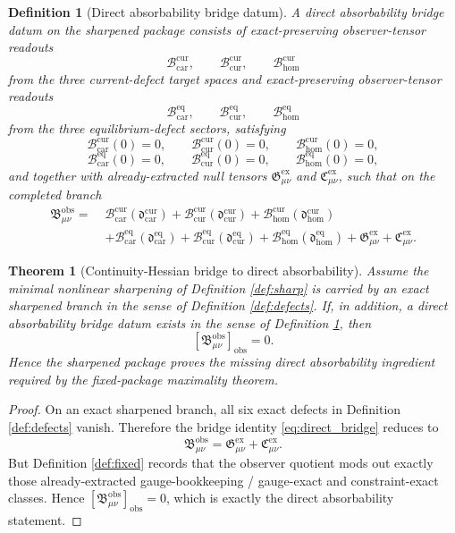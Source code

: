 \documentclass[11pt]{article}
\newcommand{\ObsBurden}{\mathfrak B_{\mu\nu}^{\mathrm{obs}}}
\newcommand{\ObserverClass}[1]{\left[#1\right]_{\mathrm{obs}}}
\newcommand{\GaugeExact}{\mathfrak G_{\mu\nu}^{\mathrm{ex}}}
\newcommand{\ConstraintExact}{\mathfrak C_{\mu\nu}^{\mathrm{ex}}}
\newcommand{\TensorCurrentBridge}{\mathcal B_{\mathrm{car}}^{\mathrm{cur}}}
\newcommand{\CurCurrentBridge}{\mathcal B_{\mathrm{cur}}^{\mathrm{cur}}}
\newcommand{\HomCurrentBridge}{\mathcal B_{\mathrm{hom}}^{\mathrm{cur}}}
\newcommand{\TensorEqBridge}{\mathcal B_{\mathrm{car}}^{\mathrm{eq}}}
\newcommand{\CurEqBridge}{\mathcal B_{\mathrm{cur}}^{\mathrm{eq}}}
\newcommand{\HomEqBridge}{\mathcal B_{\mathrm{hom}}^{\mathrm{eq}}}
\newtheorem{definition}{Definition}
\newtheorem{theorem}{Theorem}
\begin{document}
\begin{definition}[Direct absorbability bridge datum]
\label{def:direct_bridge}
A \emph{direct absorbability bridge datum} on the sharpened package consists of exact-preserving observer-tensor readouts
\[
\TensorCurrentBridge,\qquad
\CurCurrentBridge,\qquad
\HomCurrentBridge
\]
from the three current-defect target spaces and exact-preserving observer-tensor readouts
\[
\TensorEqBridge,\qquad
\CurEqBridge,\qquad
\HomEqBridge
\]
from the three equilibrium-defect sectors, satisfying
\[
\TensorCurrentBridge(0)=0,\qquad
\CurCurrentBridge(0)=0,\qquad
\HomCurrentBridge(0)=0,
\]
\[
\TensorEqBridge(0)=0,\qquad
\CurEqBridge(0)=0,\qquad
\HomEqBridge(0)=0,
\]
and together with already-extracted null tensors \(\GaugeExact\) and \(\ConstraintExact\), such that on the completed branch
\begin{equation}
\begin{aligned}
\ObsBurden
=\;&
\TensorCurrentBridge\!\left(\mathfrak d_{\mathrm{car}}^{\mathrm{cur}}\right)
+\CurCurrentBridge\!\left(\mathfrak d_{\mathrm{cur}}^{\mathrm{cur}}\right)
+\HomCurrentBridge\!\left(\mathfrak d_{\mathrm{hom}}^{\mathrm{cur}}\right)
\\
&+\TensorEqBridge\!\left(\mathfrak d_{\mathrm{car}}^{\mathrm{eq}}\right)
+\CurEqBridge\!\left(\mathfrak d_{\mathrm{cur}}^{\mathrm{eq}}\right)
+\HomEqBridge\!\left(\mathfrak d_{\mathrm{hom}}^{\mathrm{eq}}\right)
+\GaugeExact+\ConstraintExact.
\end{aligned}
\label{eq:direct_bridge}
\end{equation}
\end{definition}

\begin{theorem}[Continuity-Hessian bridge to direct absorbability]
\label{thm:direct}
Assume the minimal nonlinear sharpening of Definition \ref{def:sharp} is carried by an exact sharpened branch in the sense of Definition \ref{def:defects}. If, in addition, a direct absorbability bridge datum exists in the sense of Definition \ref{def:direct_bridge}, then
\begin{equation}
\ObserverClass{\ObsBurden}=0.
\label{eq:direct_result}
\end{equation}
Hence the sharpened package proves the missing direct absorbability ingredient required by the fixed-package maximality theorem.
\end{theorem}

\begin{proof}
On an exact sharpened branch, all six exact defects in Definition \ref{def:defects} vanish. Therefore the bridge identity \eqref{eq:direct_bridge} reduces to
\[
\ObsBurden=\GaugeExact+\ConstraintExact.
\]
But Definition \ref{def:fixed} records that the observer quotient mods out exactly those already-extracted gauge-bookkeeping / gauge-exact and constraint-exact classes. Hence \(\ObserverClass{\ObsBurden}=0\), which is exactly the direct absorbability statement.
\end{proof}
\end{document}

